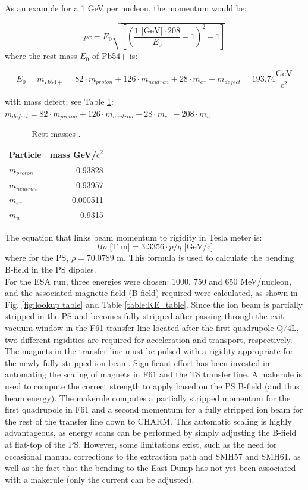 As an example for a 1 GeV per nucleon, the momentum would be:

$$pc = E_{0}\sqrt{\left [ \left( \frac{1\text{ [GeV]}\cdot 208}{E_{0}}+1\right )^{2}-1\right ]}$$
where the rest mass $E_{0}$ of Pb54+ is:

$$E_{0} = m_{Pb54+}= 82\cdot m_{proton} + 126\cdot m_{neutron} + 28\cdot m_{e^{-}} - m_{defect} = 193.74 \frac{\text{GeV}}{\text{c}^{2}}$$

with mass defect; see Table \ref{table:masses}: $m_{defect}=82\cdot m_{proton} + 126\cdot m_{neutron} + 28\cdot m_{e^{-}} - 208\cdot m_{u}$ 

\begin{table}[h!]
\centering
\begin{tabular}{lr}
\toprule
Particle & mass GeV/$\text{c}^{2}$\\
\midrule
$m_{proton}$ & 0.93828      \\
$m_{neutron}$ & 0.93957      \\
$m_{e^{-}}$ & 0.000511 \\
$m_{u}$ & 0.9315       \\
\bottomrule
\end{tabular}
\caption{Rest masses \cite{boston_university_nuclear_nodate}.}
\label{table:masses}
\end{table}

The equation that links beam momentum to rigidity in Tesla meter is: 
$$B\rho \text{ [T m]} = 3.3356\cdot p/q \text{ [GeV/c]}$$
where for the PS, $\rho = 70.0789$ m. This formula is used to calculate the bending B-field in the PS dipoles.
\\

For the ESA run, three energies were chosen: 1000, 750 and 650 MeV/nucleon, and the associated magnetic field (B-field) required were calculated, as shown in Fig. \ref{fig:lookup table} and Table \ref{table:KE_table}. Since the ion beam is partially stripped in the PS and becomes fully stripped after passing through the exit vacuum window in the F61 transfer line located after the first quadrupole Q74L, two different rigidities are required for acceleration and transport, respectively. The magnets in the transfer line must be pulsed with a rigidity appropriate for the newly fully stripped ion beam. Significant effort has been invested in automating the scaling of magnets in F61 and the T8 transfer line. A makerule is used to compute the correct strength to apply based on the PS B-field (and thus beam energy). The makerule computes a partially stripped momentum for the first quadrupole in F61 and a second momentum for a fully stripped ion beam for the rest of the transfer line down to CHARM. This automatic scaling is highly advantageous, as energy scans can be performed by simply adjusting the B-field at flat-top of the PS. However, some limitations exist, such as the need for occasional manual corrections to the extraction path and SMH57 and SMH61, as well as the fact that the bending to the East Dump has not yet been associated with a makerule (only the current can be adjusted).


